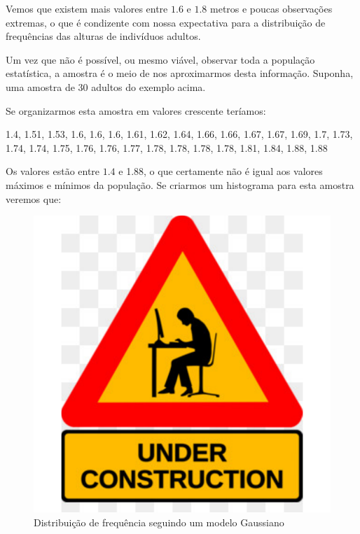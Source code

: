 \documentclass[
]{book}
\begin{document}
Vemos que existem mais valores entre \(1.6\) e \(1.8\) metros e poucas observações extremas, o que é condizente com nossa expectativa para a distribuição de frequências das alturas de indivíduos adultos.

Um vez que não é possível, ou mesmo viável, observar toda a população estatística, a amostra é o meio de nos aproximarmos desta informação. Suponha, uma amostra de 30 adultos do exemplo acima.

Se organizarmos esta amostra em valores crescente teríamos:

1.4, 1.51, 1.53, 1.6, 1.6, 1.6, 1.61, 1.62, 1.64, 1.66, 1.66, 1.67, 1.67, 1.69, 1.7, 1.73, 1.74, 1.74, 1.75, 1.76, 1.76, 1.77, 1.78, 1.78, 1.78, 1.78, 1.81, 1.84, 1.88, 1.88

Os valores estão entre \(1.4\) e 1.88, o que certamente não é igual aos valores máximos e mínimos da população. Se criarmos um histograma para esta amostra veremos que:

\begin{figure}

{\centering \includegraphics{probest-cambientais_files/figure-latex/unnamed-chunk-237-1} 

}

\caption{Distribuição de frequência seguindo um modelo Gaussiano}\label{fig:unnamed-chunk-237}
\end{figure}
\end{document}
